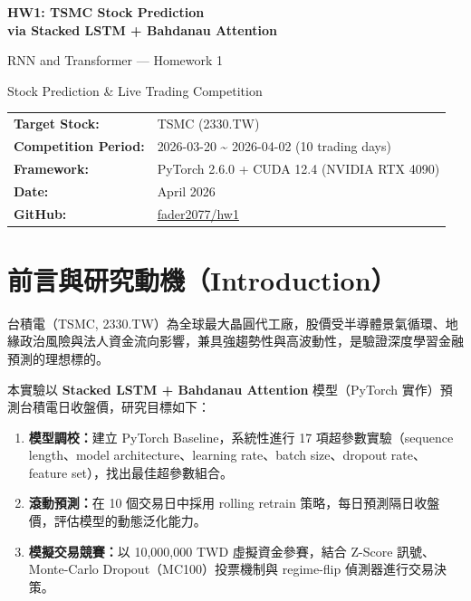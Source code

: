 \documentclass[12pt,a4paper]{article}
\begin{document}
\begin{titlepage}
\centering
\vspace*{2cm}
{\LARGE\bfseries HW1: TSMC Stock Prediction\\[6pt]
via Stacked LSTM + Bahdanau Attention\par}
\vspace{1.5cm}
{\large RNN and Transformer — Homework 1\par}
{\large Stock Prediction \& Live Trading Competition\par}
\vspace{1cm}
\begin{tabular}{ll}
  \textbf{Target Stock:}       & TSMC (2330.TW) \\
  \textbf{Competition Period:} & 2026-03-20 \textasciitilde{} 2026-04-02 (10 trading days) \\
  \textbf{Framework:}          & PyTorch 2.6.0 + CUDA 12.4 (NVIDIA RTX 4090) \\
  \textbf{Date:}               & April 2026 \\
  \textbf{GitHub:}             & \href{https://github.com/fader2077/Recurrent-Neural-Network-and-Transformer-HW/tree/main/hw1}{fader2077/hw1} \\
\end{tabular}
\end{titlepage}

\tableofcontents
\newpage

\section{前言與研究動機（Introduction）}

台積電（TSMC, 2330.TW）為全球最大晶圓代工廠，股價受半導體景氣循環、地緣政治風險與法人資金流向影響，兼具強趨勢性與高波動性，是驗證深度學習金融預測的理想標的。

本實驗以 \textbf{Stacked LSTM + Bahdanau Attention} 模型（PyTorch 實作）預測台積電日收盤價，研究目標如下：

\begin{enumerate}[label=\textbf{Phase \arabic*.}, leftmargin=3.8cm]
  \item \textbf{模型調校：}建立 PyTorch Baseline，系統性進行 17 項超參數實驗（sequence length、model architecture、learning rate、batch size、dropout rate、feature set），找出最佳超參數組合。
  \item \textbf{滾動預測：}在 10 個交易日中採用 rolling retrain 策略，每日預測隔日收盤價，評估模型的動態泛化能力。
  \item \textbf{模擬交易競賽：}以 10,000,000 TWD 虛擬資金參賽，結合 Z-Score 訊號、Monte-Carlo Dropout（MC100）投票機制與 regime-flip 偵測器進行交易決策。
\end{enumerate}
\end{document}

